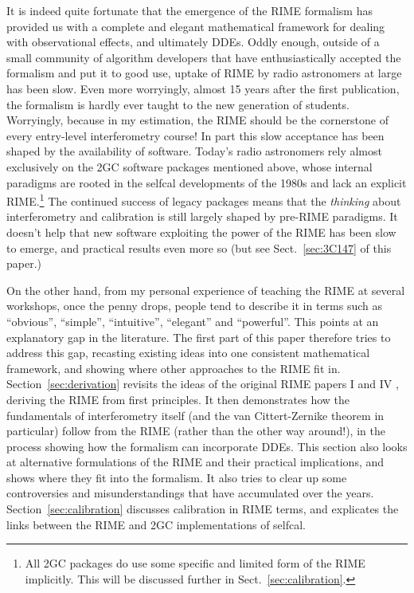 \documentclass[]{aa}
\begin{document}
It is indeed quite fortunate that the emergence of the RIME formalism has provided us with a complete and elegant mathematical framework for dealing with observational effects, and ultimately DDEs. Oddly enough, outside of a small community of algorithm developers that have enthusiastically accepted the formalism and put it to good use, uptake of RIME by radio astronomers at large has been slow. Even more worryingly, almost 15 years after the first publication, the formalism is hardly ever taught to the new generation of students. Worryingly, because in my estimation, the RIME should be the cornerstone of every entry-level interferometry course! In part this slow acceptance has been shaped by the availability of software. Today's radio astronomers rely almost exclusively on the 2GC software packages mentioned above, whose internal paradigms are rooted in the selfcal developments of the 1980s and lack an explicit RIME.\footnote{All 2GC packages do use some specific and limited form of the RIME implicitly. This will be discussed further in Sect.~\ref{sec:calibration}.} The continued success of legacy packages means that the {\em thinking} about interferometry and calibration is still largely shaped by pre-RIME paradigms. It doesn't help that new software exploiting the power of the RIME has been slow to emerge, and practical results even more so (but see Sect.~\ref{sec:3C147} of this paper.)  

On the other hand, from my personal experience of teaching the RIME at several workshops, once the penny drops, people tend to describe it in terms such as ``obvious'', ``simple'', ``intuitive'', ``elegant'' and ``powerful''. This points at an explanatory gap in the literature. The first part of this paper therefore tries to address this gap, recasting existing ideas into one consistent mathematical framework, and showing where other approaches to the RIME fit in. Section~\ref{sec:derivation} revisits the ideas of the original RIME papers I \citep{ME1} and IV \citep{ME4}, deriving the RIME from first principles. It then demonstrates how the fundamentals of interferometry itself (and the van Cittert-Zernike theorem in particular) follow from the RIME (rather than the other way around!), in the process showing how the formalism can incorporate DDEs. This section also looks at alternative formulations of the RIME and their practical implications, and shows where they fit into the formalism. It also tries to clear up some controversies and misunderstandings that have accumulated over the years. Section~\ref{sec:calibration} discusses calibration in RIME terms, and explicates the links between the RIME and 2GC implementations of selfcal. 
\end{document}
